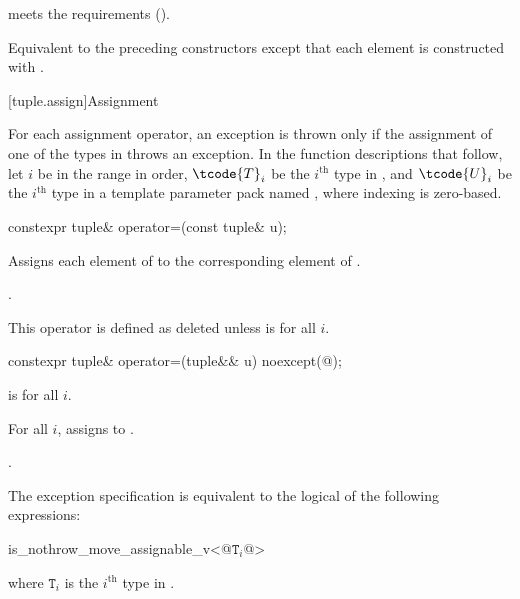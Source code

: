 \begin{itemdescr}
\pnum
\expects
{} meets the
 requirements ().

\pnum
\effects
Equivalent to the preceding constructors except that each element is constructed with
.
\end{itemdescr}

[tuple.assign]{Assignment}

\pnum
For each  assignment operator, an exception is thrown only if the
assignment of one of the types in  throws an exception.
In the function descriptions that follow, let $i$ be in the range 
in order, $\tcode{T}_i$ be the $i^\text{th}$ type in ,
and $\tcode{U}_i$ be the $i^\text{th}$ type in a
template parameter pack named , where indexing is zero-based.

%
\begin{itemdecl}
constexpr tuple& operator=(const tuple& u);
\end{itemdecl}

\begin{itemdescr}
\pnum
\effects
Assigns each element of  to the corresponding
element of .

\pnum
\returns
{}.

\pnum
\remarks
This operator is defined as deleted unless
 is  for all $i$.
\end{itemdescr}

%
\begin{itemdecl}
constexpr tuple& operator=(tuple&& u) noexcept(@\seebelow@);
\end{itemdecl}

\begin{itemdescr}
\pnum
\constraints
{} is  for all $i$.

\pnum
\effects
For all $i$, assigns  to
.

\pnum
\returns
{}.

\pnum
\remarks
The exception specification is equivalent to the logical  of the
following expressions:
\begin{codeblock}
is_nothrow_move_assignable_v<@$\mathtt{T}_i$@>
\end{codeblock}
where $\mathtt{T}_i$ is the $i^\text{th}$ type in .
\end{itemdescr}

